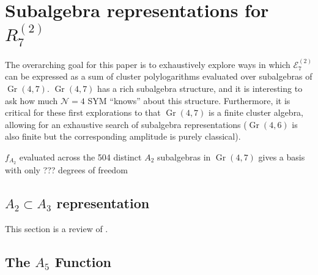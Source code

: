 \documentclass[11pt]{article}
\DeclareMathOperator{\Gr}{Gr}
\def\pdfeq#1{\texorpdfstring{$#1$}{a}}
\begin{document}
\section{Subalgebra representations for \pdfeq{R_7^{(2)}}}\label{sec:R27-reps} 

The overarching goal for this paper is to exhaustively explore ways in which $\mathcal{E}^{(2)}_{7}$ can be expressed as a sum of cluster polylogarithms evaluated over subalgebras of $\Gr(4,7)$. $\Gr(4,7)$ has a rich subalgebra structure, and it is interesting to ask how much $\mathcal{N}=4$ SYM ``knows'' about this structure. Furthermore, it is critical for these first explorations to that $\Gr(4,7)$ is a finite cluster algebra, allowing for an exhaustive search of subalgebra representations ($\Gr(4,6)$ is also finite but the corresponding amplitude is purely classical). 

$f_{A_2}$ evaluated across the 504 distinct $A_2$ subalgebras in $\Gr(4,7)$ gives a basis with only ??? degrees of freedom

\subsection{\pdfeq{A_2\subset A_3} representation}
This section is a review of \cite{Golden:2014xqa,Golden:2014xqf}. 


\subsection{The \pdfeq{A_5} Function}\label{a5-func}
\end{document}
